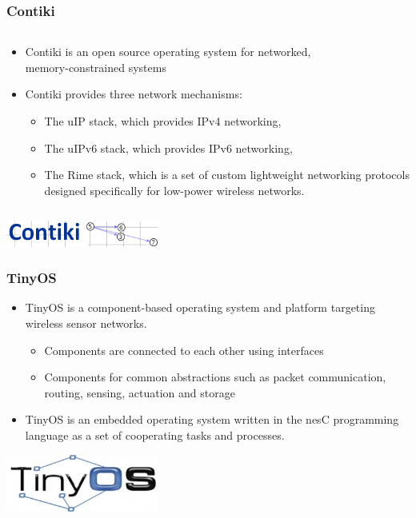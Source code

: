 \documentclass{beamer}
\begin{document}
\begin{frame}
	\frametitle{Contiki}
	\begin{columns}[c]
		\begin{column}{30cm}
			\vspace{.1cm}
			\begin{itemize}
				\justifying
				\item Contiki is an open source operating system for \textcolor{TextOrange}{networked},\\
				\textcolor{TextOrange}{memory-constrained} systems
				\item Contiki provides three network mechanisms:
				\begin{itemize}
					\justifying
					\item The uIP stack, which provides IPv4 networking,
					\item The uIPv6 stack, which provides IPv6 networking,
					\item The Rime stack, which is a set of custom lightweight networking protocols\\
					designed specifically for low-power wireless networks.
				\end{itemize}
			\end{itemize}
		\end{column}
	\end{columns}
	\vspace{.5cm}
	\hspace*{5.5cm} \includegraphics[width=5cm]{figs/contiki-logo.png}
\end{frame}

\begin{frame}
	\frametitle{TinyOS}
	\begin{itemize}
		\item TinyOS is a \textcolor{TextOrange}{component-based} operating system and platform targeting wireless sensor networks.
		\begin{itemize}
			\item Components are connected to each other using interfaces
			\item Components for common abstractions such as packet communication, routing, sensing, actuation and storage
		\end{itemize}
		\item TinyOS is an embedded operating system written in the \textcolor{TextOrange}{nesC programming language} as a set of cooperating tasks and processes.
	\end{itemize}
	\vspace{.5cm}
	\hspace*{5.5cm} \includegraphics[width=5cm]{figs/tinyos-logo.jpg}
\end{frame}
\end{document}
